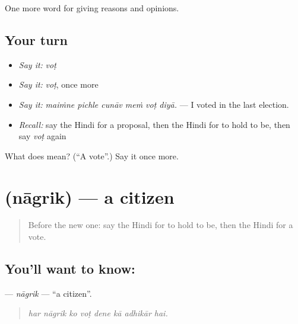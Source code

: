 \begin{grammarlens}[title={What you've built}]
One more word for giving reasons and opinions.
\end{grammarlens}

\subsection*{Your turn}
\begin{itemize}
\raggedright
  \item \emph{Say it:} \emph{voṭ}
  \item \emph{Say it:} \emph{voṭ}, once more
  \item \emph{Say it:} \emph{maiṁne pichle cunāv meṁ voṭ diyā.} — I voted in the last election.
  \item \emph{Recall:} say the Hindi for a proposal, then the Hindi for to hold to be, then say \emph{voṭ} again
\end{itemize}

\begin{tcolorbox}[breakable,colback=teal!4,colframe=teal!35!black,title={Before you move on}]
What does  mean? (\textquotedblleft{}A vote\textquotedblright{}.) Say it once more.
\end{tcolorbox}
\section[\texorpdfstring{\hi{नागरिक} (nāgrik)}{नागरिक (nāgrik)}]{ (nāgrik) — a citizen}

\label{lesson:HI-C354-nagrik}



\begin{quote}
Before the new one: say the Hindi for to hold to be, then the Hindi for a vote.
\end{quote}

\subsection*{You'll want to know: }
\textbf{} — \emph{nāgrik} — \textquotedblleft{}a citizen\textquotedblright{}.

\begin{quote}
       
\end{quote}

\begin{quote}
\emph{har nāgrik ko voṭ dene kā adhikār hai.}
\end{quote}

